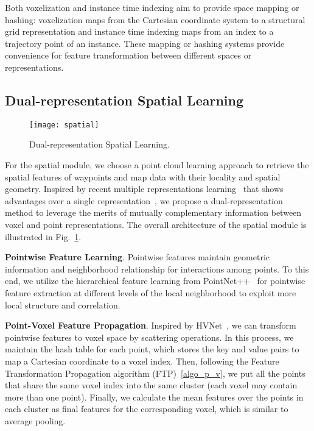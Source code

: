 \documentclass[final]{cvpr}
\begin{document}
Both voxelization and instance time indexing aim to provide space mapping or hashing: voxelization maps from the Cartesian coordinate system to a structural grid representation and instance time indexing maps from an index to a trajectory point of an instance. These mapping or hashing systems provide convenience for feature transformation between different spaces or representations.








\subsection{Dual-representation Spatial Learning}
\label{sec:dual-representation spatial}
\begin{figure}[t]
    \centering
    \texttt{[image: spatial]}
    \caption{Dual-representation Spatial Learning.}
    \label{spatial module}
\end{figure}
For the spatial module, we choose a point cloud learning approach to retrieve the spatial features of waypoints and map data with their locality and spatial geometry.  
Inspired by recent multiple representations learning~\cite{shi2020pv, tang2020searching} that shows advantages over a single representation~\cite{qiPointNetDeepHierarchical2017a, thomas2019kpconv}, 
we propose a dual-representation method to leverage the merits of mutually complementary information between voxel and point representations. The overall architecture of the spatial module is illustrated in Fig.~\ref{spatial module}. 


\textbf{Pointwise Feature Learning}. Pointwise features maintain geometric information and neighborhood relationship for interactions among points. 
To this end, we utilize the hierarchical feature learning from PointNet++~\cite{qiPointNetDeepHierarchical2017a} for pointwise feature extraction at different levels of the local neighborhood to exploit more local structure and correlation. 

\textbf{Point-Voxel Feature Propagation}. Inspired by HVNet~\cite{ye2020hvnet}, we can transform pointwise features to voxel space by scattering operations. In this process, 
we maintain the hash table for each point, which stores the key and value pairs to map a Cartesian coordinate to a voxel index. 
Then, following the Feature Transformation Propagation algorithm (FTP)~\ref{algo_p_v}, we put all the points that share the same voxel index into the same cluster (each voxel may contain more than one point). Finally, we calculate the mean features over the points in each cluster as final features for the corresponding voxel, which is similar to average pooling.
\end{document}
